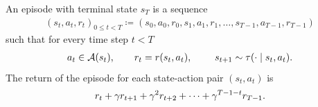 \begin{definition}[Episode]
An episode with terminal state $s_T$ is a sequence
\begin{align*}
    (s_t, a_t, r_t)_{0 \leq t < T} \coloneqq (s_0, a_0, r_0, s_1, a_1, r_1, \dots, s_{T-1}, a_{T-1}, r_{T-1})
\end{align*}
such that for every time step $t < T$
\begin{align*}
    a_t \in \mathcal{A}(s_t) ,
    \quad\quad
    r_t = r(s_t, a_t) ,
    \quad\quad
    \ s_{t+1} \sim \tau(\cdot \mid s_t, a_t) .
\end{align*}
The return of the episode for each state-action pair $(s_t, a_t)$ is
\begin{align*}
    r_t + \gamma r_{t+1} + \gamma^2 r_{t+2} + \dots + \gamma^{T-1-t} r_{T-1} .
\end{align*}
\end{definition}